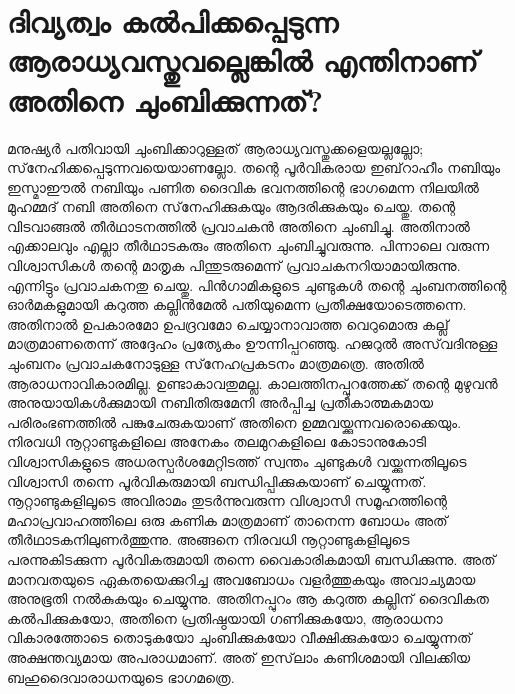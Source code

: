  \section{ദിവ്യത്വം കല്‍പിക്കപ്പെടുന്ന ആരാധ്യവസ്തുവല്ലെങ്കില്‍ എന്തിനാണ് അതിനെ ചുംബിക്കുന്നത്?  }  
 മനുഷ്യര്‍ പതിവായി ചുംബിക്കാറുള്ളത് ആരാധ്യവസ്തുക്കളെയല്ലല്ലോ; സ്‌നേഹിക്കപ്പെടുന്നവയെയാണല്ലോ. തന്റെ പൂര്‍വികരായ ഇബ്‌റാഹീം നബിയും ഇസ്മാഈല്‍ നബിയും പണിത ദൈവിക ഭവനത്തിന്റെ ഭാഗമെന്ന നിലയില്‍ മുഹമ്മദ് നബി അതിനെ സ്‌നേഹിക്കുകയും ആദരിക്കുകയും ചെയ്തു. തന്റെ വിടവാങ്ങല്‍ തീര്‍ഥാടനത്തില്‍ പ്രവാചകന്‍ അതിനെ ചുംബിച്ചു. അതിനാല്‍ എക്കാലവും എല്ലാ തീര്‍ഥാടകരും അതിനെ ചുംബിച്ചുവരുന്നു. പിന്നാലെ വരുന്ന വിശ്വാസികള്‍ തന്റെ മാതൃക പിന്തുടരുമെന്ന് പ്രവാചകനറിയാമായിരുന്നു. എന്നിട്ടും പ്രവാചകനതു ചെയ്തു. പിന്‍ഗാമികളുടെ ചുണ്ടുകള്‍ തന്റെ ചുംബനത്തിന്റെ ഓര്‍മകളുമായി കറുത്ത കല്ലിന്‍മേല്‍ പതിയുമെന്ന പ്രതീക്ഷയോടെത്തന്നെ. അതിനാല്‍ ഉപകാരമോ ഉപദ്രവമോ ചെയ്യാനാവാത്ത വെറുമൊരു കല്ല് മാത്രമാണതെന്ന് അദ്ദേഹം പ്രത്യേകം ഊന്നിപ്പറഞ്ഞു.
ഹജറുല്‍ അസ്‌വദിനുള്ള ചുംബനം പ്രവാചകനോടുള്ള സ്‌നേഹപ്രകടനം മാത്രമത്രെ. അതില്‍ ആരാധനാവികാരമില്ല. ഉണ്ടാകാവതുമല്ല. കാലത്തിനപ്പുറത്തേക്ക് തന്റെ മുഴുവന്‍ അനുയായികള്‍ക്കുമായി നബിതിരുമേനി അര്‍പ്പിച്ച പ്രതീകാത്മകമായ പരിരംഭണത്തില്‍ പങ്കുചേരുകയാണ് അതിനെ ഉമ്മവയ്ക്കുന്നവരൊക്കെയും. നിരവധി നൂറ്റാണ്ടുകളിലെ അനേകം തലമുറകളിലെ കോടാനുകോടി വിശ്വാസികളുടെ അധരസ്പര്‍ശമേറ്റിടത്ത് സ്വന്തം ചുണ്ടുകള്‍ വയ്ക്കുന്നതിലൂടെ വിശ്വാസി തന്നെ പൂര്‍വികരുമായി ബന്ധിപ്പിക്കുകയാണ് ചെയ്യുന്നത്. നൂറ്റാണ്ടുകളിലൂടെ അവിരാമം തുടര്‍ന്നുവരുന്ന വിശ്വാസി സമൂഹത്തിന്റെ മഹാപ്രവാഹത്തിലെ ഒരു കണിക മാത്രമാണ് താനെന്ന ബോധം അത് തീര്‍ഥാടകനിലുണര്‍ത്തുന്നു. അങ്ങനെ നിരവധി നൂറ്റാണ്ടുകളിലൂടെ പരന്നുകിടക്കുന്ന പൂര്‍വികരുമായി തന്നെ വൈകാരികമായി ബന്ധിക്കുന്നു. അത് മാനവതയുടെ ഏകതയെക്കുറിച്ച അവബോധം വളര്‍ത്തുകയും അവാച്യമായ അനുഭൂതി നല്‍കുകയും ചെയ്യുന്നു. അതിനപ്പുറം ആ കറുത്ത കല്ലിന് ദൈവികത കല്‍പിക്കുകയോ, അതിനെ പ്രതിഷ്ഠയായി ഗണിക്കുകയോ, ആരാധനാ വികാരത്തോടെ തൊടുകയോ ചുംബിക്കുകയോ വീക്ഷിക്കുകയോ ചെയ്യുന്നത് അക്ഷന്തവ്യമായ അപരാധമാണ്. അത് ഇസ്‌ലാം കണിശമായി വിലക്കിയ ബഹുദൈവാരാധനയുടെ ഭാഗമത്രെ. 


